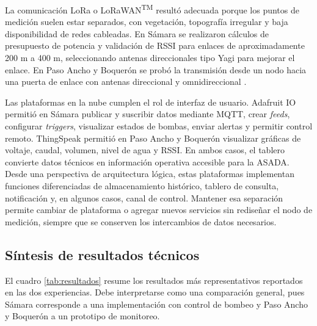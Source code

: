 \documentclass[12pt,letterpaper]{article}
\begin{document}
La comunicación LoRa o LoRaWAN\textsuperscript{TM} resultó adecuada porque los puntos de medición suelen estar separados, con vegetación, topografía irregular y baja disponibilidad de redes cableadas. En Sámara se realizaron cálculos de presupuesto de potencia y validación de RSSI para enlaces de aproximadamente 200 m a 400 m, seleccionando antenas direccionales tipo Yagi para mejorar el enlace. En Paso Ancho y Boquerón se probó la transmisión desde un nodo hacia una puerta de enlace con antenas direccional y omnidireccional \cite{solorzano2021,oviedo2024}.

Las plataformas en la nube cumplen el rol de interfaz de usuario. Adafruit IO permitió en Sámara publicar y suscribir datos mediante MQTT, crear \textit{feeds}, configurar \textit{triggers}, visualizar estados de bombas, enviar alertas y permitir control remoto. ThingSpeak permitió en Paso Ancho y Boquerón visualizar gráficas de voltaje, caudal, volumen, nivel de agua y RSSI. En ambos casos, el tablero convierte datos técnicos en información operativa accesible para la ASADA. Desde una perspectiva de arquitectura lógica, estas plataformas implementan funciones diferenciadas de almacenamiento histórico, tablero de consulta, notificación y, en algunos casos, canal de control. Mantener esa separación permite cambiar de plataforma o agregar nuevos servicios sin rediseñar el nodo de medición, siempre que se conserven los intercambios de datos necesarios.

\subsection{Síntesis de resultados técnicos}
El cuadro \ref{tab:resultados} resume los resultados más representativos reportados en las dos experiencias. Debe interpretarse como una comparación general, pues Sámara corresponde a una implementación con control de bombeo y Paso Ancho y Boquerón a un prototipo de monitoreo.
\end{document}
